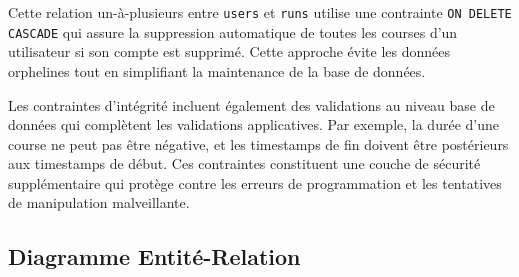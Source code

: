 Cette relation un-à-plusieurs entre \texttt{users} et \texttt{runs} utilise une contrainte \texttt{ON DELETE CASCADE} qui assure la suppression automatique de toutes les courses d'un utilisateur si son compte est supprimé. Cette approche évite les données orphelines tout en simplifiant la maintenance de la base de données.

Les contraintes d'intégrité incluent également des validations au niveau base de données qui complètent les validations applicatives. Par exemple, la durée d'une course ne peut pas être négative, et les timestamps de fin doivent être postérieurs aux timestamps de début. Ces contraintes constituent une couche de sécurité supplémentaire qui protège contre les erreurs de programmation et les tentatives de manipulation malveillante.

\subsection{Diagramme Entité-Relation}

